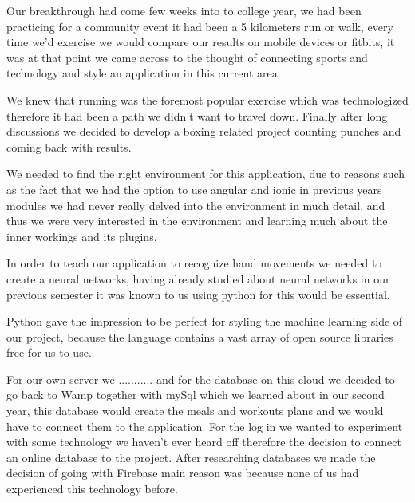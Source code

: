 \documentclass[a4paper,12pt,twoside]{report}
\begin{document}
Our breakthrough had come few weeks into to college year, we had been practicing for a community event it had been a 5 kilometers run or walk, every time we'd exercise we would compare our results on mobile devices or fitbits, it was at that point we came across to the thought of connecting sports and technology and style an application in this current area. 

We knew that running was the foremost popular exercise which was technologized therefore it had been a path we didn't want to travel down. Finally after long discussions we decided to develop a boxing related project counting punches and coming back with results.

We needed to find the right environment for this application, due to reasons such as the fact that we had the option to use angular and ionic in previous years modules we had never really delved into the environment in much detail, and thus we were very interested in the environment and learning much about the inner workings and its plugins.

In order to teach our application to recognize hand movements we needed to create a neural networks, having already studied about neural networks in our previous semester it was known to us using python for this would be essential.

Python gave the impression to be perfect for styling the machine learning side of
our project, because the language contains a vast array of open source libraries
free for us to use.

For our own server we ........... and for the database on this cloud we decided to go back to Wamp together with mySql which we learned about in  our second year, this database would create the meals and workouts plans and we would have to connect them to the application.
For the log in we wanted to experiment with some technology we haven't ever heard off therefore the decision to connect an online database to the project. After researching databases we made the decision of going with Firebase main reason was because none of us had experienced this technology before.

\newpage
\end{document}
